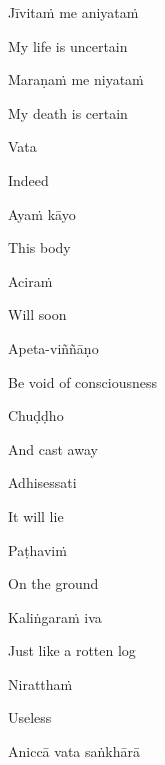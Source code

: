 Jīvitaṁ me aniyataṁ

\begin{english}
  My life is uncertain
\end{english}

Maraṇaṁ me niyataṁ

\begin{english}
  My death is certain
\end{english}

\suttaRef{[Dhp A]}

Vata

\begin{english}
  Indeed
\end{english}

Ayaṁ kāyo

\begin{english}
  This body
\end{english}

Aciraṁ

\begin{english}
  Will soon
\end{english}

Apeta-viññāṇo

\begin{english}
  Be void of consciousness
\end{english}

Chuḍḍho

\begin{english}
  And cast away
\end{english}

Adhisessati

\begin{english}
  It will lie
\end{english}

Paṭhaviṁ

\begin{english}
  On the ground
\end{english}

Kaliṅgaraṁ iva

\begin{english}
  Just like a rotten log
\end{english}

Niratthaṁ

\begin{english}
  Useless
\end{english}

\suttaRef{[Dhp 41]}

Aniccā vata saṅkhārā

